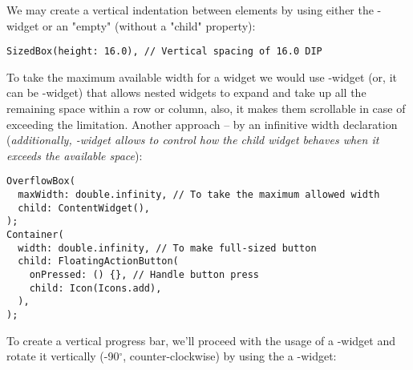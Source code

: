 \noindent We may create a vertical indentation between elements by using either the -widget or an "empty" 
 (without a "child" property):

\begin{lstlisting}
SizedBox(height: 16.0), // Vertical spacing of 16.0 DIP
\end{lstlisting}

\noindent To take the maximum available width for a widget we would use -widget (or, it can be 
-widget) that allows nested widgets to expand and take up all the remaining space within a row or column, 
also, it makes them scrollable in case of exceeding the limitation. Another approach -- by an infinitive width 
declaration (\emph{additionally, -widget allows to control how the child widget behaves when it 
exceeds the available space}):

\begin{lstlisting}
OverflowBox(
  maxWidth: double.infinity, // To take the maximum allowed width
  child: ContentWidget(),
);
Container(
  width: double.infinity, // To make full-sized button
  child: FloatingActionButton(
    onPressed: () {}, // Handle button press
    child: Icon(Icons.add),
  ),
);
\end{lstlisting}

\noindent To create a vertical progress bar, we'll proceed with the usage of a -widget and 
rotate it vertically (-90$^{\circ}$, counter-clockwise) by using the a -widget:

